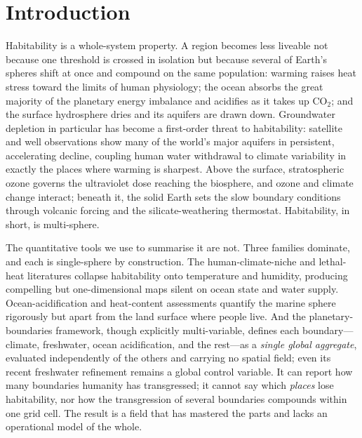 \documentclass[10pt]{article}
\begin{document}
\section*{Introduction}
Habitability is a whole-system property. A region becomes less liveable not
because one threshold is crossed in isolation but because several of Earth's
spheres shift at once and compound on the same population: warming raises heat
stress toward the limits of human physiology\citep{Sherwood2010, Lenton2023};
the ocean absorbs the great majority of the planetary energy
imbalance\citep{vonSchuckmann2020} and acidifies as it takes up
CO$_2$\citep{Doney2009, HoeghGuldberg2007}; and the surface hydrosphere dries and
its aquifers are drawn down. Groundwater depletion in particular has become a
first-order threat to habitability: satellite and well observations show many of
the world's major aquifers in persistent, accelerating
decline\citep{Rodell2018, Famiglietti2014, Jasechko2024}, coupling human water
withdrawal to climate variability in exactly the places where warming is
sharpest. Above the surface, stratospheric ozone governs the ultraviolet dose
reaching the biosphere, and ozone and climate change interact\citep{Barnes2019,
Bais2018}; beneath it, the solid Earth sets the slow boundary conditions through
volcanic forcing\citep{Robock2000} and the silicate-weathering
thermostat\citep{Walker1981}. Habitability, in short, is multi-sphere.

The quantitative tools we use to summarise it are not. Three families dominate,
and each is single-sphere by construction. The human-climate-niche and lethal-heat
literatures collapse habitability onto temperature and humidity, producing
compelling but one-dimensional maps silent on ocean state and water
supply\citep{Xu2020, Sherwood2010}. Ocean-acidification and heat-content
assessments quantify the marine sphere rigorously but apart from the land surface
where people live\citep{Doney2009, vonSchuckmann2020}. And the planetary-boundaries
framework\citep{Rockstrom2009, Steffen2015, Richardson2023}, though explicitly
multi-variable, defines each boundary—climate, freshwater, ocean acidification,
and the rest—as a \emph{single global aggregate}, evaluated independently of the
others and carrying no spatial field; even its recent freshwater
refinement\citep{WangErlandsson2022} remains a global control variable. It can
report how many boundaries humanity has transgressed; it cannot say which
\emph{places} lose habitability, nor how the transgression of several boundaries
compounds within one grid cell. The result is a field that has mastered the parts
and lacks an operational model of the whole.
\end{document}
